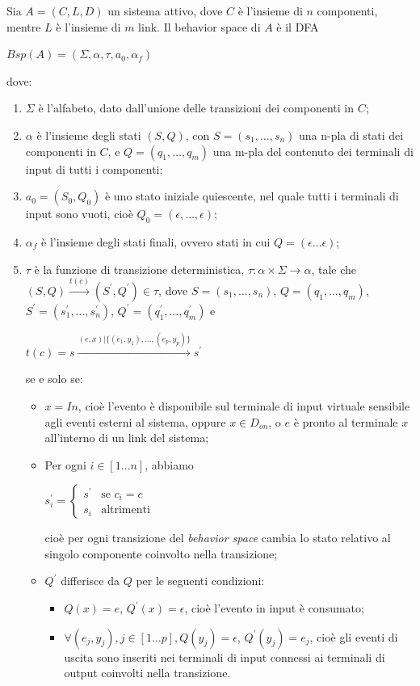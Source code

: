 \begin{defn}
Sia $A = (C,L,D)$ un sistema attivo, dove $C$ è l'insieme di $n$ componenti, mentre $L$ è l'insieme di $m$ link. Il behavior space di $A$ è il DFA
\begin{center}
	$Bsp(A) = (\Sigma,\alpha,\tau,a_0,\alpha_f)$
\end{center}
dove:
\begin{enumerate}
\item $\Sigma$ è l'alfabeto, dato dall'unione delle transizioni dei componenti in $C$;
\item $\alpha$  è l'insieme degli stati $(S,Q)$, con $S = (s_1,\ldots,s_n)$ una n-pla di stati dei componenti in $C$, e $Q = (q_1, \ldots,q_m)$ una m-pla del contenuto dei terminali di input di tutti i componenti;
\item $a_0 = (S_0,Q_0)$ è uno stato iniziale quiescente, nel quale tutti i terminali di input sono vuoti, cioè $Q_0 = (\epsilon, \ldots, \epsilon)$;
\item $\alpha_f$ è l'insieme degli stati finali, ovvero stati in cui $Q = (\epsilon \ldots \epsilon)$;
\item $\tau$ è la funzione di transizione deterministica, $\tau: \alpha \times \Sigma \rightarrow \alpha$, tale che $(S,Q) \xrightarrow{t(c)} (S^\prime, Q^\prime) \in \tau$, dove $S = (s_1, \ldots,s_n)$, $Q = (q_1, \ldots,q_m)$, $S^\prime = (s^\prime_1, \ldots,s^\prime_n)$, $Q^\prime = (q^\prime_1, \ldots,q^\prime_m)$ e
\begin{center}
$t(c) = s \xrightarrow{(e,x) | \{(e_1,y_1), \ldots, (e_p,y_p)\}} s^\prime$
\end{center}
se e solo se:
\begin{itemize}
\item $x = In$, cioè l'evento è disponibile sul terminale di input virtuale sensibile agli eventi esterni al sistema, oppure $x \in D_{on}$, o $e$ è pronto al terminale $x$ all'interno di un link del sistema;
\item Per ogni $i \in [1 \ldots n]$, abbiamo
\begin{center}
$s^\prime_i = \begin{cases} s^\prime & \mbox{se }c_i = c\\ s_i & \mbox{altrimenti} \end{cases}$
\end{center}
cioè per ogni transizione del \emph{behavior space} cambia lo stato relativo al singolo componente coinvolto nella transizione;
\item $Q^\prime$ differisce da $Q$ per le seguenti condizioni:
\begin{itemize}
\item $Q(x) = e$, $Q^\prime(x) = \epsilon$, cioè l'evento in input è consumato;
\item $\forall(e_j,y_j), j \in [1 \ldots p], Q(y_j) = \epsilon$, $Q^\prime(y_j) = e_j$, cioè gli eventi di uscita sono inseriti nei terminali di input connessi ai terminali di output coinvolti nella transizione. 
\end{itemize}
\end{itemize}
\end{enumerate}
\end{defn}
